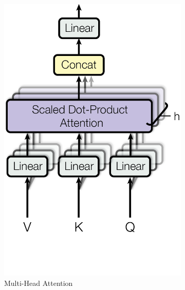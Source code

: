 \begin{figure}
\begin{subfigure}[b]{0.3\textwidth}
         \label{fig:scaled_dot_product}
     \end{subfigure}
     \hfill
     \begin{subfigure}[b]{0.3\textwidth}
         \centering
         \includegraphics[width=\textwidth]{graphic/attention.png}
         \caption{Multi-Head Attention}
         \label{fig:multi_head_attention}
     \end{subfigure}
     \hfill
     \begin{subfigure}[b]{0.3\textwidth}
         \centering

\end{subfigure}
\end{figure}

